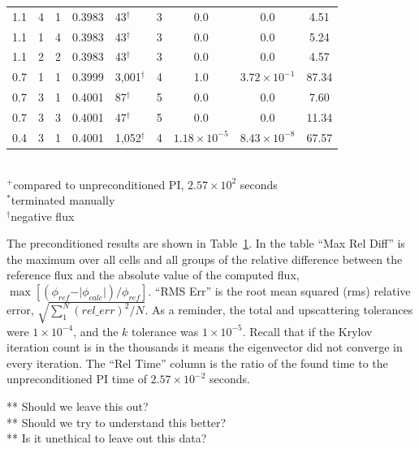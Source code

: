 \documentclass[preprint,12pt]{elsarticle}
\begin{document}
\begin{table}[!h]
\begin{center}
\begin{tabular}{| c | c | c | c | l | c | c | c | c |}
\hline
1.1 & 4 & 1 & 0.3983 & 43$^{\dag}$      & 3 & 0.0 & 0.0 & 4.51 \\ %
1.1 & 1 & 4 & 0.3983 & 43$^{\dag}$      & 3 & 0.0 & 0.0 & 5.24 \\ %
1.1 & 2 & 2 & 0.3983 & 43$^{\dag}$      & 3 & 0.0 & 0.0 & 4.57 \\ %
\hline
0.7 & 1 & 1 & 0.3999 & 3,001$^{\dag}$ & 4 & 1.0 & $3.72 \times 10^{-1}$ & 87.34 \\ %
0.7 & 3 & 1 & 0.4001 & 87$^{\dag}$      & 5 & 0.0 & 0.0 & 7.60 \\ %
0.7 & 3 & 3 & 0.4001 & 47$^{\dag}$      & 5 & 0.0 & 0.0 & 11.34 \\ %
0.4 & 3 & 1 & 0.4001 & 1,052$^{\dag}$ & 4 & $1.18 \times 10^{-5}$ & $8.43 \times 10^{-8}$      & 67.57 \\ %
\hline 
\end{tabular}\\
$^{+}$compared to unpreconditioned PI, $2.57 \times 10^{2}$ seconds\\
$^{*}$terminated manually\\
$^{\dag}$negative flux
\end{center}
\label{table:impi RQI}
\end{table}
%
The preconditioned results are shown in Table~\ref{table:impi RQI}. In the table ``Max Rel Diff'' is the maximum over all cells and all groups of the relative difference between the reference flux and the absolute value of the computed flux, $\max[ (\phi_{ref} - \vert\phi_{calc}\vert) / \phi_{ref}]$. ``RMS Err'' is the root mean squared (rms) relative error, $\sqrt{ \sum_{1}^{N}(rel\_err)^{2} / N}$. As a reminder, the total and upscattering tolerances were $1 \times 10^{-4}$, and the $k$ tolerance was $1 \times 10^{-5}$. Recall that if the Krylov iteration count is in the thousands it means the eigenvector did not converge in every iteration. The ``Rel Time'' column is the ratio of the found time to the unpreconditioned PI time of $2.57 \times 10^{-2}$ seconds.

** Should we leave this out?\\
** Should we try to understand this better?\\
** Is it unethical to leave out this data?\\
\end{document}
